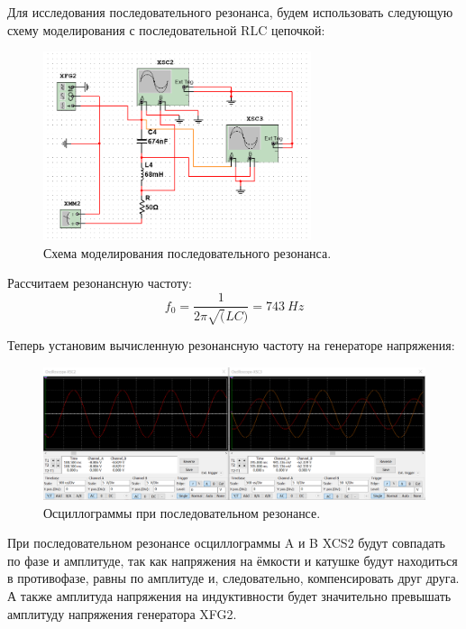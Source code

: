 \documentclass[12pt]{article}
\begin{document}
Для исследования последовательного резонанса, будем использовать следующую схему моделирования с последовательной RLC цепочкой:
\begin{figure}[H]
    \centering
    \includegraphics[width=0.7\textwidth]{8_scheme.png}
    \caption{Схема моделирования последовательного резонанса.}
    \label{fig:8_scheme}
\end{figure}

Рассчитаем резонансную частоту:
\[  
    f_0 = \frac{1}{2 \pi \sqrt(LC)} = 743 \ Hz
\]

Теперь установим вычисленную резонансную частоту на генераторе напряжения:
\begin{figure}[H]
    \centering
    \includegraphics[width=\textwidth]{8_osc_plots.png}
    \caption{Осциллограммы при последовательном резонансе.}
    \label{fig:8_osc_plots}
\end{figure}

При последовательном резонансе осциллограммы A и B XCS2 будут совпадать по фазе и амплитуде, так как напряжения на ёмкости и катушке будут находиться в противофазе, равны по амплитуде и, следовательно, компенсировать друг друга. \\
А также амплитуда напряжения на индуктивности будет значительно превышать амплитуду напряжения генератора XFG2. \\
\ \\
\end{document}
